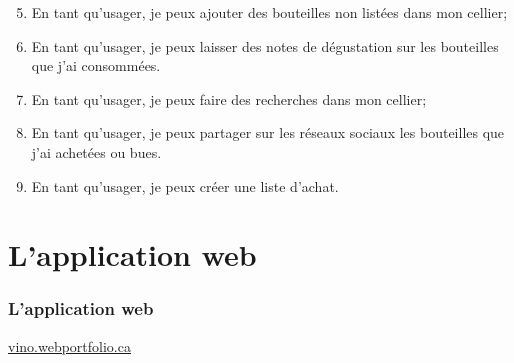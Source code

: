 \documentclass{beamer}
\begin{document}
\begin{frame}
\begin{enumerate}
	\setcounter{enumi}{4}
	\item En tant qu’usager, je peux ajouter des bouteilles \og non listées \fg{} dans mon cellier;
	\item En tant qu’usager, je peux laisser des notes de dégustation sur les bouteilles que j’ai consommées.
	\item En tant qu’usager, je peux faire des recherches dans mon cellier;
	\item En tant qu’usager, je peux partager sur les réseaux sociaux les bouteilles que j’ai achetées ou bues.
	\item En tant qu’usager, je peux créer une liste d’achat.
\end{enumerate}
\end{frame}

\section{L’application web}
\begin{frame}
\frametitle{L’application web}
\href{http://vino.webportfolio.ca/}{vino.webportfolio.ca}
\end{frame}
\end{document}
